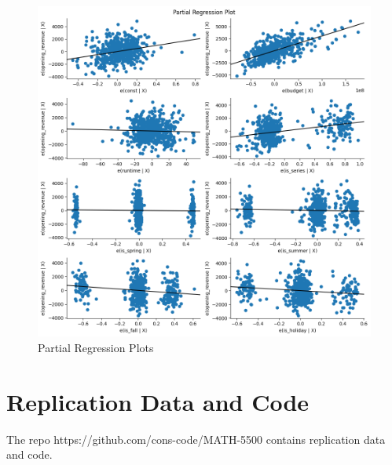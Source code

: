 \documentclass[10pt]{article}
\begin{document}
\begin{figure}[H]
	\begin{center}
		\centerline{\includegraphics[width=\columnwidth]{partial_regression}}
		\caption{Partial Regression Plots}
	\end{center}
\end{figure}

\section{Replication Data and Code}
\label{a:code}
The repo \mbox{https://github.com/cons-code/MATH-5500} contains replication data and code.
\end{document}

